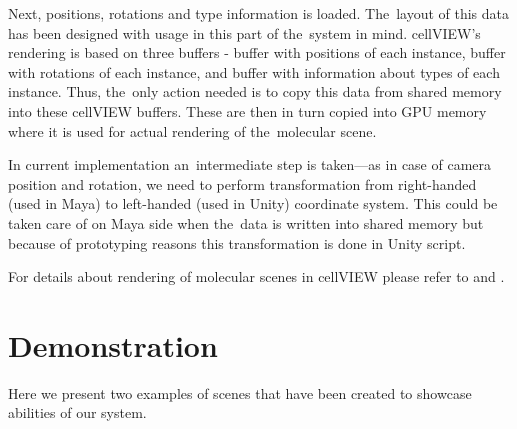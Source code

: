 \documentclass[
  digital, %
  table,   %
  nolof,     %
  nolot,     %
  oneside,
]{fithesis3}
\begin{document}
Next, positions, rotations and type information is loaded. The layout of this data has been designed with usage in this part of the system in mind. cellVIEW's rendering is based on three buffers - buffer with positions of each instance, buffer with rotations of each instance, and buffer with information about types of each instance. Thus, the only action needed is to copy this data from shared memory into these cellVIEW buffers. These are then in turn copied into GPU memory where it is used for actual rendering of the molecular scene.

In current implementation an intermediate step is taken—as in case of camera position and rotation, we need to perform transformation from right-handed (used in Maya) to left-handed (used in Unity) coordinate system. This could be taken care of on Maya side when the data is written into shared memory but because of prototyping reasons this transformation is done in Unity script.

For details about rendering of molecular scenes in cellVIEW please refer to \cite{lemuzic-2014-ivm} and \cite{cellVIEW_2015}.

\chapter{Demonstration}
\label{chap:demonstration}
Here we present two examples of scenes that have been created to showcase abilities of our system.
\end{document}
